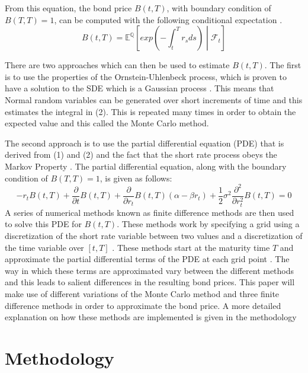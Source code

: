 \documentclass[12pt,a4paper]{article}
\begin{document}
From this equation, the bond price $B(t,T)$, with boundary condition of $B(T,T) = 1$, can be computed with the following conditional expectation \citep{mamon2004three}.
\begin{equation}
B(t,T) = \mathbb{E}^{\mathbb{Q}}\left[exp\left(-\int_{t}^{T}r_{s} ds\right)\middle\vert\mathcal{F}_{t}\right]
\end{equation}

There are two approaches which can then be used to estimate $B(t,T)$. The first is to use the properties of the Ornstein-Uhlenbeck process, which is proven to have a solution to the SDE which is a Gaussian process \citep{finch2004ornstein}. This means that Normal random variables can be generated over short increments of time and this estimates the integral in (2). This is repeated many times in order to obtain the expected value and this called the Monte Carlo method.

The second approach is to use the partial differential equation (PDE) that is derived from (1) and (2) and the fact that the short rate process obeys the Markov Property \citep{mamon2004three}. The partial differential equation, along with the  boundary condition of $B(T,T) = 1$, is given as follows:
\begin{equation}
-r_t B(t,T) + \frac{\partial}{\partial t} B(t,T) + \frac{\partial}{\partial r_t}B(t,T)(\alpha - \beta r_t) +\frac{1}{2} \sigma^2 \frac{\partial^2}{\partial r_t^2} B(t,T) = 0 
\end{equation}
A series of numerical methods known as finite difference methods are then used to solve this PDE for $B(t,T)$. These methods work by specifying a grid using a discretization of the short rate variable between two values and a discretization of the time variable over $[t,T]$ \citep{ketsise2006monitoring}. These methods start at the maturity time $T$ and approximate the partial differential terms of the PDE at each grid point \citep{crank}. The way in which these terms are approximated vary between the different methods and this leads to salient differences in the resulting bond prices. This paper will make use of different variations of the Monte Carlo method and three finite difference methods in order to approximate the bond price. A more detailed explanation on how these methods are implemented is given in the methodology


\newpage
\section{Methodology}
\label{sec: Method}
\end{document}
